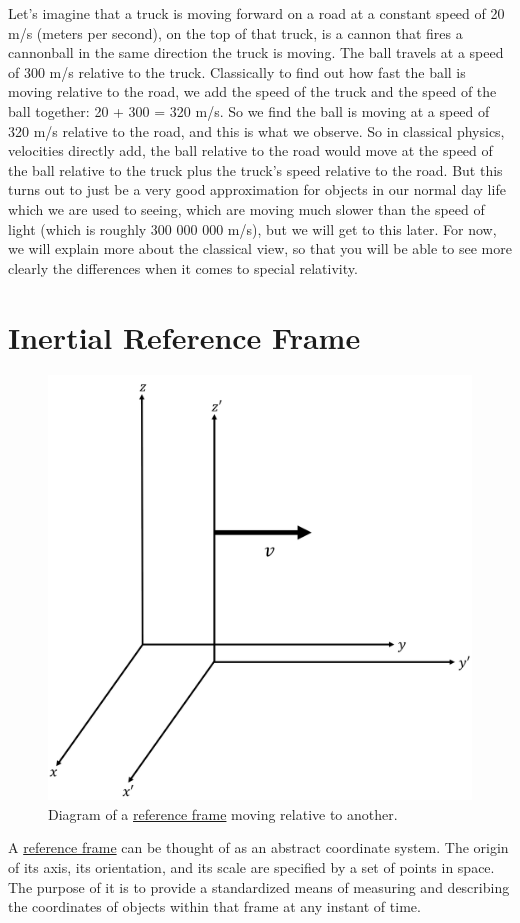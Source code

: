 Let's imagine that a truck is moving forward on a road at a constant speed of 20 m/s (meters per second), on the top of that truck, is a cannon that fires a cannonball in the same direction the truck is moving. The ball travels at a speed of 300 m/s relative to the truck. Classically to find out how fast the ball is moving relative to the road, we add the speed of the truck and the speed of the ball together: 20 + 300 = 320 m/s. So we find the ball is moving at a speed of 320 m/s relative to the road, and this is what we observe. So in classical physics, velocities directly add, the ball relative to the road would move at the speed of the ball relative to the truck plus the truck's speed relative to the road.
But this turns out to just be a very good approximation for objects in our normal day life which we are used to seeing, which are moving much slower than the speed of light (which is roughly 300 000 000 m/s), but we will get to this later. For now, we will explain more about the classical view, so that you will be able to see more clearly the differences when it comes to special relativity.

\section{Inertial Reference Frame}

\begin{figure}[H]
	\centering
	\includegraphics[width=0.35 \textwidth]{images/pdf/Reference Frames.pdf}
	\caption{Diagram of a \protect\hyperlink{def-Reference-frame}{reference frame} moving relative to another.}
	\label{fig: Reference Frames}
\end{figure}

A \hyperlink{def-Reference-frame}{reference frame} can be thought of as an abstract coordinate system. The origin of its axis, its orientation, and its scale are specified by a set of points in space. The purpose of it is to provide a standardized means of measuring and describing the coordinates of objects within that frame at any instant of time.

